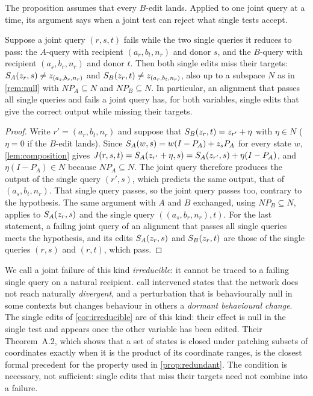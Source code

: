 The proposition assumes that every $B$-edit lands. Applied to one joint query at a time, its argument says when a
joint test can reject what single tests accept.

\begin{corollary}\label{cor:irreducible}
Suppose a joint query $(r,s,t)$ fails while the two single queries it reduces to pass: the $A$-query with
recipient $(a_r,b_t,n_r)$ and donor $s$, and the $B$-query with recipient $(a_s,b_r,n_r)$ and donor $t$. Then both
single edits miss their targets: $S_A(z_r,s)\ne z_{(a_s,b_r,n_r)}$ and $S_B(z_r,t)\ne z_{(a_r,b_t,n_r)}$, also up
to a subspace $N$ as in \cref{rem:null} with $NP_A\subseteq N$ and $NP_B\subseteq N$. In particular, an alignment
that passes all single queries and fails a joint query has, for both variables, single edits that give the
correct output while missing their targets.
\end{corollary}

\begin{proof}
Write $r'=(a_r,b_t,n_r)$ and suppose that $S_B(z_r,t)=z_{r'}+\eta$ with $\eta\in N$ ($\eta=0$ if the $B$-edit lands).
Since $S_A(w,s)=w(I-P_A)+z_sP_A$ for every state $w$, \cref{lem:composition} gives
$J(r,s,t)=S_A(z_{r'}+\eta,s)=S_A(z_{r'},s)+\eta(I-P_A)$, and $\eta(I-P_A)\in N$ because $NP_A\subseteq N$. The joint
query therefore produces the output of the single query $(r',s)$, which predicts the same output, that of
$(a_s,b_t,n_r)$. That single query passes, so the joint query passes too, contrary to the hypothesis. The same
argument with $A$ and $B$
exchanged, using $NP_B\subseteq N$, applies to $S_A(z_r,s)$ and the single query $((a_s,b_r,n_r),t)$. For the last
statement, a failing joint query of an alignment that passes all single queries meets the hypothesis, and its edits
$S_A(z_r,s)$ and $S_B(z_r,t)$ are those of the single queries $(r,s)$ and $(r,t)$, which pass.
\end{proof}

We call a joint failure of this kind \emph{irreducible}: it cannot be traced to a failing single query on a
natural recipient. \citet{grant2026divergent} call intervened states that the network does not reach naturally
\emph{divergent}, and a perturbation that is behaviourally null in some contexts but changes behaviour in others a
\emph{dormant behavioural change}. The single edits of \cref{cor:irreducible} are of this kind: their effect is
null in the single test and appears once the other variable has been edited. Their Theorem~A.2, which shows that a
set of states is closed under patching subsets of coordinates exactly when it is the product of its coordinate
ranges, is the closest formal precedent for the property used in \cref{prop:redundant}. The condition is necessary,
not sufficient: single edits that miss their targets need not combine into a failure.

